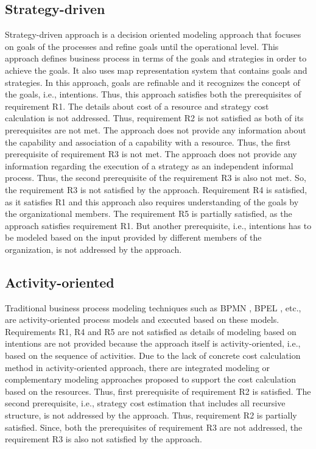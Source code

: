 \subsection{Strategy-driven} 
Strategy-driven approach is a decision oriented modeling approach that focuses on goals of the processes and refine goals until the operational level. This approach defines business process in terms of the goals and strategies in order to achieve the goals. It also uses map representation system that contains goals and strategies. In this approach, goals are refinable and it recognizes the concept of the goals, i.e., intentions. Thus, this approach satisfies both the prerequisites of requirement R1. The details about cost of a resource and strategy cost calculation is not addressed. Thus, requirement R2 is not satisfied as both of its prerequisites are not met. The approach does not provide any information about the capability and association of a capability with a resource. Thus, the first prerequisite of requirement R3 is not met. The approach does not provide any information regarding the execution of a strategy as an independent informal process. Thus, the second prerequisite of the requirement R3 is also not met. So, the requirement R3 is not satisfied by the approach. Requirement R4 is satisfied, as it satisfies R1 and this approach also requires understanding of the goals by the organizational members. The requirement R5 is partially satisfied, as the approach satisfies requirement R1. But another prerequisite, i.e., intentions has to be modeled based on the input provided by different members of the organization, is not addressed by the approach. 

\subsection{Activity-oriented} 
Traditional business process modeling techniques such as BPMN \cite{bpm2011}, BPEL \cite{Std.2007}, etc., are activity-oriented process models and executed based on these models. Requirements R1, R4 and R5 are not satisfied as details of modeling based on intentions are not provided because the approach itself is activity-oriented, i.e., based on the sequence of activities. Due to the lack of concrete cost calculation method in activity-oriented approach, there are integrated modeling or complementary modeling approaches \cite{Bankhofer2013,Sampathkumaran2013} proposed to support the cost calculation based on the resources. Thus, first prerequisite of requirement R2 is satisfied. The second prerequisite, i.e., strategy cost estimation that includes all recursive structure, is not addressed by the approach. Thus, requirement R2 is partially satisfied. Since, both the prerequisites of requirement R3 are not addressed, the requirement R3 is also not satisfied by the approach. 

